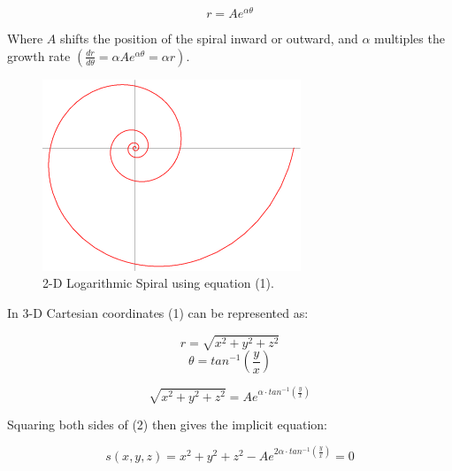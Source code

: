 \documentclass[a4paper]{article}
\begin{document}
\begin{equation}
	r = Ae^{\alpha \theta}
\end{equation}

Where $A$ shifts the position of the spiral inward or outward, and $\alpha$ multiples the growth rate $(\frac{dr}{d\theta} = \alpha A e^{\alpha \theta} = \alpha r)$.

\begin{figure}[h]
	\centering\includegraphics[scale=0.7]{./img/logarithmic-spiral.png}
	\caption{2-D Logarithmic Spiral using equation (1). \cite{logspiral}}
	\label{fig:log-spiral} %
\end{figure}

\pagebreak

In 3-D Cartesian coordinates (1) can be represented as:

$$ r = \sqrt{x^2 + y^2 + z^2 } $$
$$ \theta = tan^{-1}({\frac{y}{x}}) $$

\begin{equation}
	\sqrt{x^2 + y^2 + z^2 } = A e^{\alpha \cdot tan^{-1}({\frac{y}{x}})}
\end{equation}

Squaring both sides of (2) then gives the implicit equation:

\begin{equation}
	s(x,y,z) = x^2 + y^2 + z^2 - A e^{2 \alpha \cdot tan^{-1}({\frac{y}{x}})} = 0
\end{equation}
\end{document}
